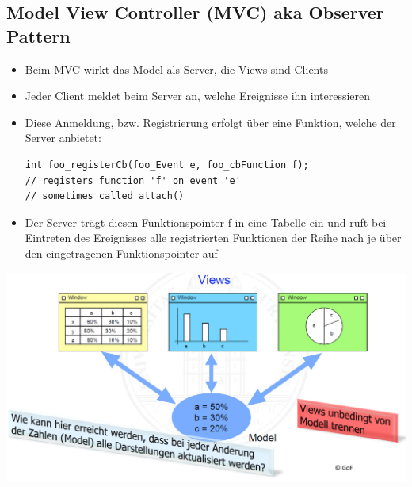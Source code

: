 \subsection{Model View Controller (MVC) aka Observer Pattern}
\begin{multicols}{2}
	\begin{itemize}
		\item Beim MVC wirkt das Model als Server, die Views sind Clients
		\item Jeder Client meldet beim Server an, welche Ereignisse ihn interessieren
		\item Diese Anmeldung, bzw. Registrierung erfolgt über eine Funktion, welche der Server anbietet:
		      \begin{lstlisting}[style=C]
int foo_registerCb(foo_Event e, foo_cbFunction f);
// registers function 'f' on event 'e'
// sometimes called attach()
		\end{lstlisting}
		\item Der Server trägt diesen Funktionspointer f in eine Tabelle ein und ruft bei Eintreten des Ereignisses alle registrierten Funktionen der Reihe nach je über den eingetragenen Funktionspointer auf
	\end{itemize}
	\columnbreak
	\includegraphics[width=\linewidth]{images/EventBasedSystems/MVC}
\end{multicols}

